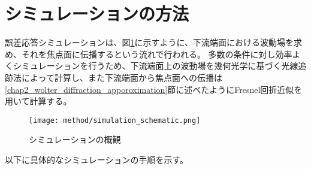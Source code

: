 \clearpage
\newpage


\section{シミュレーションの方法}
\label{chap2_simulation_methodology}

誤差応答シミュレーションは、図\ref{fig:simulation_schematic}に示すように、下流端面における波動場を求め、それを焦点面に伝播するという流れで行われる。
多数の条件に対し効率よくシミュレーションを行うため、下流端面上の波動場を幾何光学に基づく光線追跡法によって計算し、また下流端面から焦点面への伝播は\ref{chap2_wolter_diffraction_apporoximation}節に述べたようにFresnel回折近似を用いて計算する。

\begin{figure}[h]
\centering
\texttt{[image: method/simulation\_schematic.png]}
\caption{シミュレーションの概観}
\label{fig:simulation_schematic}
\end{figure}

以下に具体的なシミュレーションの手順を示す。

